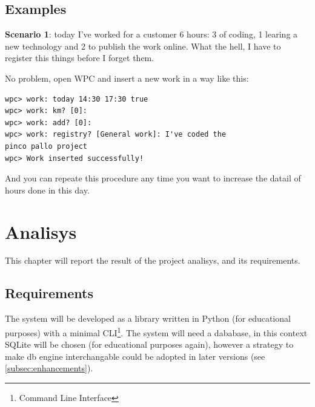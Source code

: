 \documentclass[11pt]{article}
\begin{document}
\subsection{Examples}
\textbf{Scenario 1}: today I've worked for a customer 6 hours: 3 of coding, 1 learing a new technology and 2 to publish the work online. What the hell, I have to register this things before I forget them.

No problem, open WPC and insert a new work in a way like this:

\begin{lstlisting}
wpc> work: today 14:30 17:30 true
wpc> work: km? [0]: 
wpc> work: add? [0]: 
wpc> work: registry? [General work]: I've coded the
pinco pallo project
wpc> Work inserted successfully!
\end{lstlisting}

And you can repeate this procedure any time you want to increase the datail of hours done in this day.


\section{Analisys}
This chapter will report the result of the project analisys, and its requirements.

\subsection{Requirements}
The system will be developed as a library written in Python (for educational purposes) with a minimal CLI\footnote{Command Line Interface}. The system will need a dababase, in this context SQLite will be chosen (for educational purposes again), however a strategy to make db engine interchangable could be adopted in later versions (see \ref{subsec:enhancements}).
\end{document}

